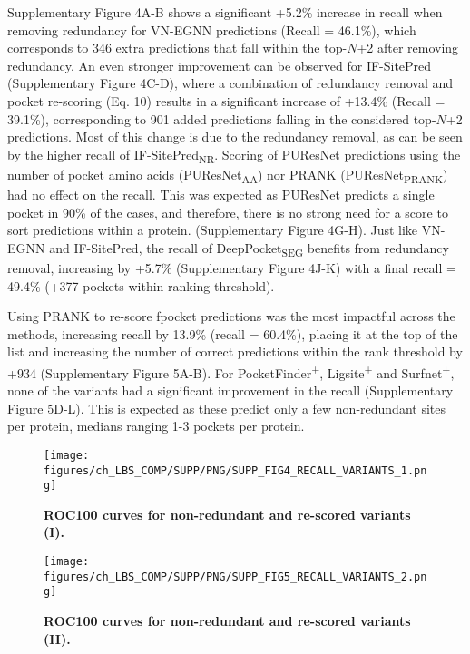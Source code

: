 Supplementary Figure 4A-B shows a significant +5.2\% increase in recall when removing redundancy for VN-EGNN predictions (Recall = 46.1\%), which corresponds to 346 extra predictions that fall within the top-$N$+2 after removing redundancy. An even stronger improvement can be observed for IF-SitePred (Supplementary Figure 4C-D), where a combination of redundancy removal and pocket re-scoring (Eq. 10) results in a significant increase of +13.4\% (Recall = 39.1\%), corresponding to 901 added predictions falling in the considered top-$N$+2 predictions. Most of this change is due to the redundancy removal, as can be seen by the higher recall of IF-SitePred\textsubscript{NR}. Scoring of PUResNet predictions using the number of pocket amino acids (PUResNet\textsubscript{AA}) nor PRANK (PUResNet\textsubscript{PRANK}) had no effect on the recall. This was expected as PUResNet predicts a single pocket in 90\% of the cases, and therefore, there is no strong need for a score to sort predictions within a protein. (Supplementary Figure 4G-H). Just like VN-EGNN and IF-SitePred, the recall of DeepPocket\textsubscript{SEG} benefits from redundancy removal, increasing by +5.7\% (Supplementary Figure 4J-K) with a final recall = 49.4\% (+377 pockets within ranking threshold).

Using PRANK to re-score fpocket predictions was the most impactful across the methods, increasing recall by 13.9\% (recall = 60.4\%), placing it at the top of the list and increasing the number of correct predictions within the rank threshold by +934 (Supplementary Figure 5A-B). For PocketFinder\textsuperscript{+}, Ligsite\textsuperscript{+} and Surfnet\textsuperscript{+}, none of the variants had a significant improvement in the recall (Supplementary Figure 5D-L). This is expected as these predict only a few non-redundant sites per protein, medians ranging 1-3 pockets per protein.

\begin{figure}[ht!]
    \centering
    \texttt{[image: figures/ch\_LBS\_COMP/SUPP/PNG/SUPP\_FIG4\_RECALL\_VARIANTS\_1.png]}
    \caption[ROC100 curves for non-redundant and re-scored variants (I)]{\textbf{ROC100 curves for non-redundant and re-scored variants (I).}}
    \label{fig:pocker_recall_variants1}
\end{figure}

\begin{figure}[ht!]
    \centering
    \texttt{[image: figures/ch\_LBS\_COMP/SUPP/PNG/SUPP\_FIG5\_RECALL\_VARIANTS\_2.png]}
    \caption[ROC100 curves for non-redundant and re-scored variants (II)]{\textbf{ROC100 curves for non-redundant and re-scored variants (II).}}
    \label{fig:pocker_recall_variants2}
\end{figure}


